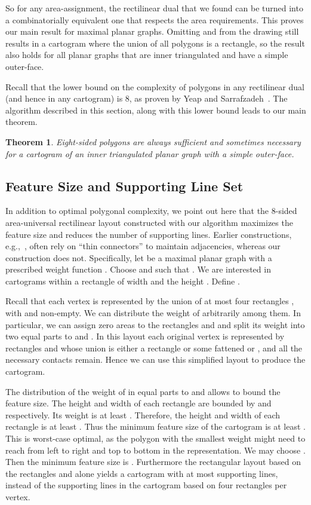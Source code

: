 \documentclass[11pt]{article}
\newtheorem{theorem}{Theorem}[section]
\begin{document}
So for any area-assignment, the rectilinear dual that we found can
be turned into a combinatorially equivalent one that respects the
area requirements.  This proves our main result for maximal planar
graphs. Omitting  and  from the drawing
still results in a cartogram where the union of all polygons is a
rectangle, so the result also holds for all planar graphs that are
inner triangulated and have a simple outer-face.

Recall that the lower bound on the complexity
of polygons in any rectilinear dual (and hence in any cartogram) is 8,
as proven by Yeap and Sarrafzadeh~\cite{ys93}. The algorithm described
in this section, along with this lower bound leads to our main theorem.


\begin{theorem}
\label{th:eight-nece-suf} Eight-sided polygons are always sufficient and sometimes necessary for
 a cartogram of an inner triangulated planar graph with a simple outer-face.
\end{theorem}


\subsection{Feature Size and Supporting Line Set}

In addition to optimal polygonal complexity, we point out here that the 8-sided area-universal
 rectilinear layout constructed with our algorithm maximizes the feature size and reduces the
 number of supporting lines. Earlier constructions, e.g.,~\cite{deBerg07,BR-WADS11},
often rely on ``thin connectors'' to maintain adjacencies, whereas our
construction does not. Specifically, let 
be a maximal planar graph with a prescribed weight function . Choose  and  such that . We are
interested in cartograms within a rectangle of width  and the height .
Define .

Recall that each vertex  is represented by the union of at most
four rectangles , with  and 
non-empty.  We can distribute the weight of  arbitrarily among them.
In particular, we can
assign zero areas to the rectangles  and  and split its weight into
two equal parts to  and .
In this layout each original vertex is represented by rectangles
 and  whose union is either a rectangle or some fattened  or ,
and all the necessary
contacts remain. Hence we can use this simplified layout to produce the
cartogram.



The distribution of the weight of  in equal parts to  and
 allows to bound the feature size.  The height and width of each
rectangle are bounded by  and  respectively.  Its weight is at
least . Therefore, the height and width of each rectangle is at
least . Thus the minimum feature size of
the cartogram is at least . This is
worst-case optimal, as the polygon with the smallest weight might need
to reach from left to right and top to bottom in the
representation. We may choose . Then the minimum feature
size is . Furthermore the rectangular
layout based on the rectangles  and  alone yields a
cartogram with at most  supporting lines, instead of the 
supporting lines in the cartogram based on four rectangles per vertex.
\end{document}
